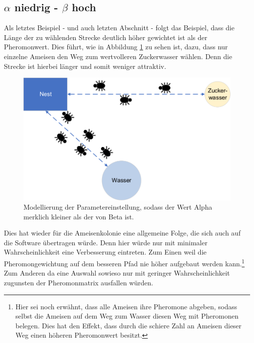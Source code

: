 {	\subsection{$\alpha$ niedrig - $\beta$ hoch}
	Als letztes Beispiel - und auch letzten Abschnitt - folgt das Beispiel, dass die Länge der zu wählenden Strecke deutlich höher gewichtet ist als der Pheromonwert. Dies führt, wie in Abbildung \ref{parameter_a<b} zu sehen ist, dazu, dass nur einzelne Ameisen den Weg zum wertvolleren Zuckerwasser wählen. Denn die Strecke ist hierbei länger und somit weniger attraktiv.
	\begin{figure}[h]
		\centering
		\includegraphics[width=0.7\linewidth]{images/AntAlgorithm_alphaLbeta.png}
		\caption{Modellierung der Parametereinstellung, sodass der Wert Alpha merklich kleiner als der von Beta ist.}
		\label{parameter_a<b}
	\end{figure}
	Dies hat wieder für die Ameisenkolonie eine allgemeine Folge, die sich auch auf die Software übertragen würde. Denn hier würde nur mit minimaler Wahrscheinlichkeit eine Verbesserung eintreten. Zum Einen weil die Pheromongewichtung auf dem besseren Pfad nie höher aufgebaut werden kann.\footnote{Hier sei noch erwähnt, dass alle Ameisen ihre Pheromone abgeben, sodass selbst die Ameisen auf dem Weg zum Wasser diesen Weg mit Pheromonen belegen. Dies hat den Effekt, dass durch die schiere Zahl an Ameisen dieser Weg einen höheren Pheromonwert besitzt.} Zum Anderen da eine Auswahl sowieso nur mit geringer Wahrscheinlichkeit zugunsten der Pheromonmatrix ausfallen würden.
}